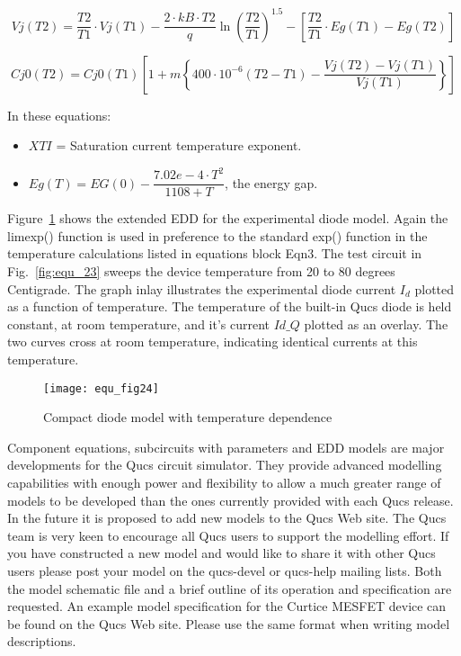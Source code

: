 \begin{equation}
 Vj (T2) = \dfrac{T2}{T1}\cdot Vj(T1) - \dfrac{2 \cdot kB \cdot T2}{q} \ln\left( \dfrac{T2}{T1}\right) ^{1.5} - \left[ \dfrac{T2}{T1}\cdot Eg(T1) - Eg(T2)\right]  
\end{equation} 

\begin{equation}
 Cj0 (T2) = Cj0 (T1)  \left[ 1+m  \left\lbrace 400\cdot 10^{-6}  \left( T2-T1\right) - \dfrac{Vj(T2)-Vj(T1)}{Vj(T1)} \right\rbrace \right]
\end{equation} 

In these equations:
\begin{itemize}
 \item $XTI$ = Saturation current temperature exponent.
 \item $Eg(T) = EG(0)-\dfrac{7.02e-4 \cdot T^{2}}{1108+T}$, the energy gap.
\end{itemize}

Figure~\ref{fig:equ_24} shows the extended EDD for the experimental
diode model. Again the limexp() function is used in preference to the
standard exp() function in the temperature calculations listed in
equations block Eqn3. The test circuit in Fig.~\ref{fig:equ_23} sweeps
the device temperature from 20 to 80 degrees Centigrade. The graph
inlay illustrates the experimental diode current $I_{d}$ plotted as a
function of temperature. The temperature of the built-in Qucs diode is
held constant, at room temperature, and it's current $Id\_Q$ plotted as
an overlay. The two curves cross at room temperature, indicating
identical currents at this temperature.



\begin{figure} 
  \centering
  \texttt{[image: equ\_fig24]}
  \caption{Compact diode model with temperature dependence} 
  \label{fig:equ_24}
\end{figure} 


Component equations, subcircuits with parameters and EDD models are
major developments for the Qucs circuit simulator. They provide
advanced modelling capabilities with enough power and flexibility to
allow a much greater range of models to be developed than the ones
currently provided with each Qucs release. In the future it is
proposed to add new models to the Qucs Web site. The Qucs team is very
keen to encourage all Qucs users to support the modelling effort. If
you have constructed a new model and would like to share it with other
Qucs users please post your model on the qucs-devel or qucs-help
mailing lists. Both the model schematic file and a brief outline of
its operation and specification are requested.  An example model
specification for the Curtice MESFET device can be found on the Qucs
Web site. Please use the same format when writing model descriptions.

